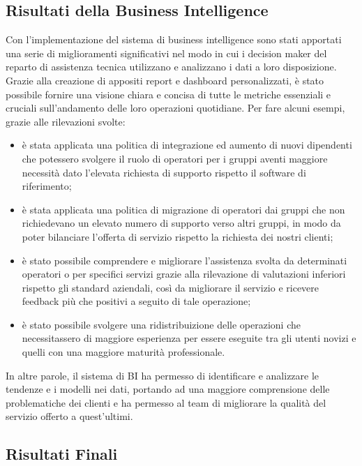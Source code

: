 \subsection{Risultati della Business Intelligence}

Con l'implementazione del sistema di business intelligence sono stati apportati una serie di miglioramenti significativi nel modo in cui i decision maker del reparto di assistenza tecnica utilizzano e analizzano i dati a loro disposizione. Grazie alla creazione di appositi report e dashboard personalizzati, è stato possibile fornire una visione chiara e concisa di tutte le metriche essenziali e cruciali sull'andamento delle loro operazioni quotidiane. Per fare alcuni esempi, grazie alle rilevazioni svolte:

\begin{itemize}
    \item è stata applicata una politica di integrazione ed aumento di nuovi dipendenti che potessero svolgere il ruolo di operatori per i gruppi aventi maggiore necessità dato l'elevata richiesta di supporto rispetto il software di riferimento;
    \item è stata applicata una politica di migrazione di operatori dai gruppi che non richiedevano un elevato numero di supporto verso altri gruppi, in modo da poter bilanciare l'offerta di servizio rispetto la richiesta dei nostri clienti;
    \item è stato possibile comprendere e migliorare l'assistenza svolta da determinati operatori o per specifici servizi grazie alla rilevazione di valutazioni inferiori rispetto gli standard aziendali, così da migliorare il servizio e ricevere feedback più che positivi a seguito di tale operazione;
    \item è stato possibile svolgere una ridistribuizione delle operazioni che necessitassero di maggiore esperienza per essere eseguite tra gli utenti novizi e quelli con una maggiore maturità professionale.
\end{itemize}

In altre parole, il sistema di BI ha permesso di identificare e analizzare le tendenze e i modelli nei dati, portando ad una maggiore comprensione delle problematiche dei clienti e ha permesso al team di migliorare la qualità del servizio offerto a quest'ultimi.

\subsection{Risultati Finali}

